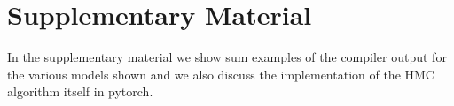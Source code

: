 \documentclass[twoside]{article}
\begin{document}
\section{Supplementary Material}
\label{sec:supmat}

In the supplementary material we show sum examples of the compiler output for the various models shown and we also discuss the implementation of the HMC algorithm itself in pytorch. 
\inputminted{python}{code/lr_out.py}
\inputminted{python}{code/hmc_class.py}

\end{document}
